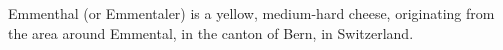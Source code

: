 Emmenthal (or Emmentaler) is a yellow, medium-hard cheese, originating from the area around Emmental, in the canton of Bern, in Switzerland.